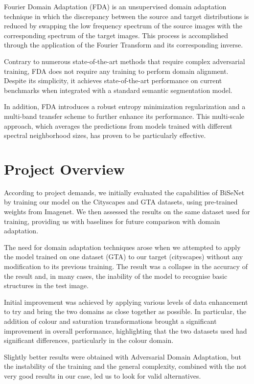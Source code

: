 \documentclass[10pt,twocolumn,letterpaper]{article}
\begin{document}
Fourier Domain Adaptation (FDA) \cite{fda} is an unsupervised domain adaptation technique in which the discrepancy between the source and target distributions is reduced by swapping the low frequency spectrum  of the source images with the corresponding spectrum of the target images. 
This process is accomplished through the application of the Fourier Transform and its corresponding inverse.

Contrary to numerous state-of-the-art methods that require complex adversarial training, FDA does not require any training to perform domain alignment. Despite its simplicity, it achieves state-of-the-art performance on current benchmarks when integrated with a standard semantic segmentation model. 

In addition, FDA introduces a robust entropy minimization regularization and a multi-band transfer scheme to further enhance its performance. This multi-scale approach, which averages the predictions from models trained with different spectral neighborhood sizes, has proven to be particularly effective.



\section{Project Overview}
According to project demands, we initially evaluated the capabilities of BiSeNet by training our model on the Cityscapes and GTA datasets, using pre-trained weights from Imagenet. We then assessed the results on the same dataset used for training, providing us with baselines for future comparison with domain adaptation.

The need for domain adaptation techniques arose when we attempted to apply the model trained on one dataset (GTA) to our target (cityscapes) without any modification to its previous training. The result was a collapse in the accuracy of the result and, in many cases, the inability of the model to recognise basic structures in the test image.

Initial improvement was achieved by applying various levels of data enhancement to try and bring the two domains as close together as possible.
In particular, the addition of colour and saturation transformations brought a significant improvement in overall performance, highlighting that the two datasets used had significant differences, particularly in the colour domain.

Slightly better results were obtained with Adversarial Domain Adaptation, but the instability of the training and the general complexity, combined with the not very good results in our case, led us to look for valid alternatives.
\end{document}
